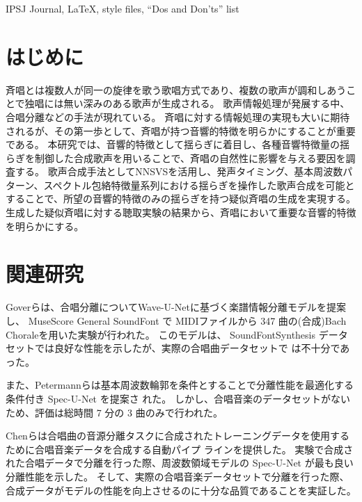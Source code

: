 \documentclass[submit]{ipsj}
\begin{document}
\begin{ekeyword}
IPSJ Journal, \LaTeX, style files, ``Dos and Don'ts'' list
\end{ekeyword}

\maketitle

\section{はじめに}

斉唱とは複数人が同一の旋律を歌う歌唱方式であり、複数の歌声が調和しあうことで独唱には無い深みのある歌声が生成される。
歌声情報処理が発展する中、合唱分離\cite{Matan2020, Peter2020, Chen2022}などの手法が現れている。
斉唱に対する情報処理の実現も大いに期待されるが、その第一歩として、斉唱が持つ音響的特徴を明らかにすることが重要である。
本研究では、音響的特徴として揺らぎに着目し、各種音響特徴量の揺らぎを制御した合成歌声を用いることで、斉唱の自然性に影響を与える要因を調査する。
歌声合成手法としてNNSVSを活用し、発声タイミング、基本周波数パターン、スペクトル包絡特徴量系列における揺らぎを操作した歌声合成を可能とすることで、所望の音響的特徴のみの揺らぎを持つ疑似斉唱の生成を実現する。
生成した疑似斉唱に対する聴取実験の結果から、斉唱において重要な音響的特徴を明らかにする。

\section{関連研究}
\label{sec:related}
Goverらは、合唱分離についてWave-U-Netに基づく楽譜情報分離モデルを提案し、
MuseScore General SoundFont で MIDIファイルから 347 曲の(合成)Bach Choraleを用いた実験が行われた。
このモデルは、 SoundFontSynthesis データセットでは良好な性能を示したが、実際の合唱曲データセットで
は不十分であった。\cite{Matan2020}

また、Petermannらは基本周波数輪郭を条件とすることで分離性能を最適化する条件付き Spec-U-Net を提案さ
れた。
しかし、合唱音楽のデータセットがないため、評価は総時間 7 分の 3 曲のみで行われた。\cite{Peter2020}

Chenらは合唱曲の音源分離タスクに合成されたトレーニングデータを使用するために合唱音楽データを合成する自動パイプ
ラインを提供した。
実験で合成された合唱データで分離を行った際、周波数領域モデルの Spec-U-Net が最も良い分離性能を示した。
そして、実際の合唱音楽データセットで分離を行った際、合成データがモデルの性能を向上させるのに十分な品質であることを実証した。\cite{Chen2022}
\end{document}

